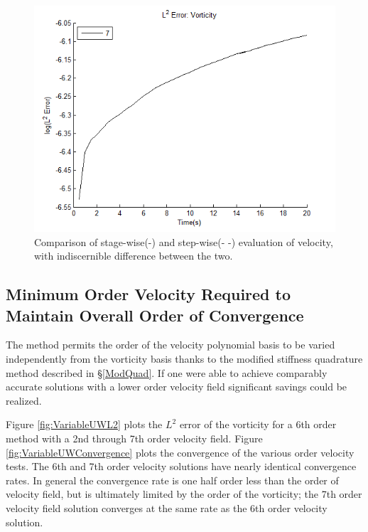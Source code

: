 \documentclass[letterpaper,12pt]{report}
\begin{document}
\begin{figure}
\centering
\includegraphics[width=1\textwidth]{StageVSStep.PNG}
\caption{\label{fig:StageVSStep}Comparison of stage-wise(-) and step-wise(- -) evaluation of velocity, with indiscernible difference between the two.}
\end{figure}

%
\subsection{Minimum Order Velocity Required to Maintain Overall Order of Convergence}
The method permits the order of the velocity polynomial basis to be varied independently from the vorticity basis thanks to the modified stiffness quadrature method described in \S \ref{ModQuad}. If one were able to achieve comparably accurate solutions with a lower order velocity field significant savings could be realized.

Figure \ref{fig:VariableUWL2} plots the $L^2$ error of the vorticity for a 6th order method with a 2nd through 7th order velocity field. Figure \ref{fig:VariableUWConvergence} plots the convergence of the various order velocity tests. The 6th and 7th order velocity solutions have nearly identical convergence rates. In general the convergence rate is one half order less than the order of velocity field, but is ultimately limited by the order of the vorticity; the 7th order velocity field solution converges at the same rate as the 6th order velocity solution.
\end{document}
